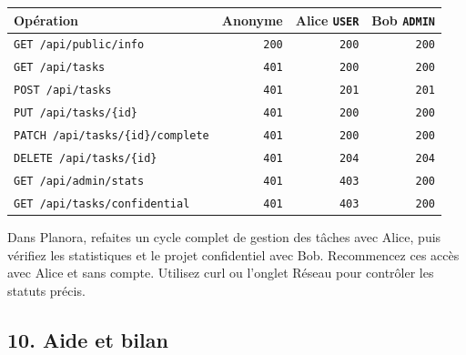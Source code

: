 \documentclass[
  french,
  10pt,
  a4paper,
]{article}
\newcounter{none} %
\begin{document}
{\def\LTcaptype{none} %
\begin{longtable}[]{@{}lrrr@{}}
\toprule\noalign{}
Opération & Anonyme & Alice \texttt{USER} & Bob \texttt{ADMIN} \\
\midrule\noalign{}
\endhead
\bottomrule\noalign{}
\endlastfoot
\texttt{GET\ /api/public/info} & \texttt{200} & \texttt{200} &
\texttt{200} \\
\texttt{GET\ /api/tasks} & \texttt{401} & \texttt{200} & \texttt{200} \\
\texttt{POST\ /api/tasks} & \texttt{401} & \texttt{201} &
\texttt{201} \\
\texttt{PUT\ /api/tasks/\{id\}} & \texttt{401} & \texttt{200} &
\texttt{200} \\
\texttt{PATCH\ /api/tasks/\{id\}/complete} & \texttt{401} & \texttt{200}
& \texttt{200} \\
\texttt{DELETE\ /api/tasks/\{id\}} & \texttt{401} & \texttt{204} &
\texttt{204} \\
\texttt{GET\ /api/admin/stats} & \texttt{401} & \texttt{403} &
\texttt{200} \\
\texttt{GET\ /api/tasks/confidential} & \texttt{401} & \texttt{403} &
\texttt{200} \\
\end{longtable}
}

Dans Planora, refaites un cycle complet de gestion des tâches avec
Alice, puis vérifiez les statistiques et le projet confidentiel avec
Bob. Recommencez ces accès avec Alice et sans compte. Utilisez curl ou
l'onglet Réseau pour contrôler les statuts précis.

\subsection{10. Aide et bilan}\label{aide-et-bilan}
\end{document}
